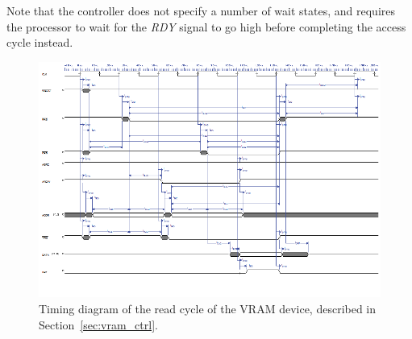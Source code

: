 \documentclass[titlepage]{scrartcl}
\begin{document}
	Note that the controller does not specify a number of wait states, and requires the processor to wait for the \textit{RDY} signal to go high before completing the access cycle instead.\\
 
	\begin{figure}[h!]
	\vspace{-2cm}
	\centerline{\includegraphics[width=20cm, angle=90, origin=c]{img/vram_read.png}}
		\vspace{1cm}
                	\caption{Timing diagram of the read cycle of the VRAM device, described in Section~\ref{sec:vram_ctrl}.}
               	\label{fig:vram_read}
	\end{figure}

	\clearpage
\end{document}
